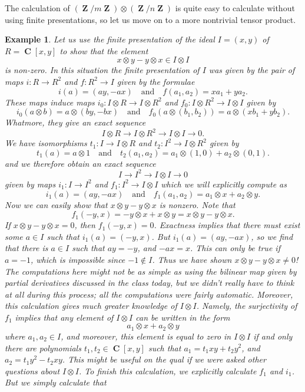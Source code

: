 \documentclass{article}
\theoremstyle{plain}
\newtheorem*{example}{Example}
\theoremstyle{remark}
\theoremstyle{definition}
\DeclareMathOperator{\ZZ}{\mathbf{Z}}
\DeclareMathOperator{\CC}{\mathbf{C}}
\begin{document}
The calculation of $(\ZZ/m \ZZ) \otimes (\ZZ / n \ZZ)$ is quite easy to calculate without using finite presentations, so let us move on to a more nontrivial tensor product.

\begin{example}
	Let us use the finite presentation of the ideal $I = (x,y)$ of $R = \CC[x,y]$ to show that the element
	\[ x \otimes y - y \otimes x \in I \otimes I \]
	is non-zero. In this situation the finite presentation of $I$ was given by the pair of maps $i: R \to R^2$ and $f: R^2 \to I$ given by the formulae
	\[ i(a) = (ay,-ax) \quad\text{and}\quad f(a_1,a_2) = xa_1 + ya_2. \]
	These maps induce maps $i_0: I \otimes R \to I \otimes R^2$ and $f_0: I \otimes R^2 \to I \otimes I$ given by
	\[ i_0(a \otimes b) = a \otimes (by, -bx) \quad\text{and}\quad f_0(a \otimes (b_1,b_2)) = a \otimes (xb_1 + yb_2). \]
	Whatmore, they give an exact sequence
	\[ I \otimes R \to I \otimes R^2 \to I \otimes I \to 0. \]
	We have isomorphisms $t_1: I \to I \otimes R$ and $t_2: I^2 \to I \otimes R^2$ given by
	\[ t_1(a) = a \otimes 1 \quad\text{and}\quad t_2(a_1,a_2) = a_1 \otimes (1,0) + a_2 \otimes (0,1). \]
	and we therefore obtain an exact sequence
	\[ I \to I^2 \to I \otimes I \to 0 \]
	given by maps $i_1: I \to I^2$ and $f_1: I^2 \to I \otimes I$ which we will explicitly compute as
	\[ i_1(a) = (ay,-ax) \quad\text{and}\quad f_1(a_1,a_2) = a_1 \otimes x + a_2 \otimes y. \]
	Now we can easily show that $x \otimes y - y \otimes x$ is nonzero. Note that
	\[ f_1(-y,x) = -y \otimes x + x \otimes y = x \otimes y - y \otimes x. \]
	If $x \otimes y - y \otimes x = 0$, then $f_1(-y,x) = 0$. Exactness implies that there must exist some $a \in I$ such that $i_1(a) = (-y,x)$. But $i_1(a) = (ay,-ax)$, so we find that there is $a \in I$ such that $ay = -y$, and $-ax = x$. This can only be true if $a = -1$, which is impossible since $-1 \not \in I$. Thus we have shown $x \otimes y - y \otimes x \neq 0$! The computations here might not be as simple as using the bilinear map given by partial derivatives discussed in the class today, but we didn't really have to think at all during this process; all the computations were fairly automatic. Moreover, this calculation gives much greater knowledge of $I \otimes I$. Namely, the surjectivity of $f_1$ implies that any element of $I \otimes I$ can be written in the form
	\[ a_1 \otimes x + a_2 \otimes y \]
	where $a_1, a_2 \in I$, and moreover, this element is equal to zero in $I \otimes I$ if and only there are polynomials $t_1,t_2 \in \CC[x,y]$ such that $a_1 = t_1xy + t_2y^2$, and $a_2 = t_1y^2 - t_2 xy$. This might be useful on the qual if we were asked other questions about $I \otimes I$. To finish this calculation, we explicitly calculate $f_1$ and $i_1$. But we simply calculate that

\end{example}
\end{document}
